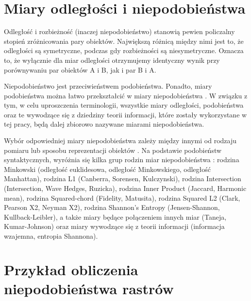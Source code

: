 \documentclass{amuthesis}
\begin{document}
\hypertarget{miary-odlegux142oux15bci-i-niepodobieux144stwa}{%
\section{Miary odległości i
niepodobieństwa}\label{miary-odlegux142oux15bci-i-niepodobieux144stwa}}

Odległość i rozbieżność (inaczej niepodobieństwo) stanowią pewien
policzalny stopień zróżnicowania pary obiektów. Największą różnicą
między nimi jest to, że odległości są symetryczne, podczas gdy
rozbieżności są niesymetryczne. Oznacza to, że wyłącznie dla miar
odległości otrzymujemy identyczny wynik przy porównywaniu par obiektów A
i B, jak i par B i A.

Niepodobieństwo jest przeciwieństwem podobieństwa. Ponadto, miary
podobieństwa można łatwo przekształcić w miary niepodobieństwa
\autocite{niesterowicz2016}. W związku z tym, w celu uproszczenia
terminologii, wszystkie miary odległości, podobieństwa oraz te wywodzące
się z dziedziny teorii informacji, które zostały wykorzystane w tej
pracy, będą dalej zbiorowo nazywane miarami niepodobieństwa.

Wybór odpowiedniej miary niepodobieństwa zależy między innymi od rodzaju
pomiaru lub sposobu reprezentacji obiektów \autocite{Cha2007}. Na
podstawie podobieństw syntaktycznych, wyróżnia się kilka grup rodzin
miar niepodobieństwa \autocite{Cha2007}: rodzina Minkowski (odległość
euklidesowa, odległość Minkowskiego, odległość Manhattan), rodzina L1
(Canberra, Sorensen, Kulczynski), rodzina Intersection (Intersection,
Wave Hedges, Ruzicka), rodzina Inner Product (Jaccard, Harmonic mean),
rodzina Squared-chord (Fidelity, Matusita), rodzina Squared L2 (Clark,
Pearson X2, Neyman X2), rodzina Shannon's Entropy (Jensen-Shannon,
Kullback-Leibler), a także miary będące połączeniem innych miar (Taneja,
Kumar-Johnson) oraz miary wywodzące się z teorii informacji (informacja
wzajemna, entropia Shannona).

\hypertarget{przykux142ad-obliczenia-niepodobieux144stwa-rastruxf3w}{%
\section{Przykład obliczenia niepodobieństwa
rastrów}\label{przykux142ad-obliczenia-niepodobieux144stwa-rastruxf3w}}
\end{document}
